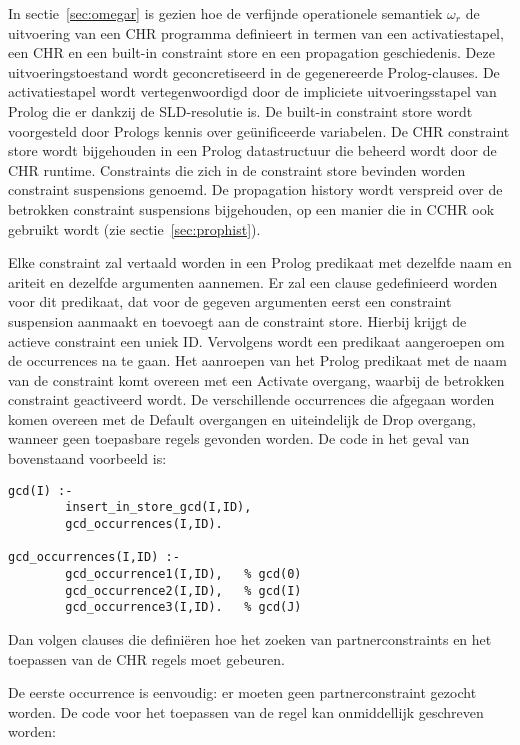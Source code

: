 In sectie~\ref{sec:omegar} is gezien hoe de verfijnde operationele semantiek $\omega_r$ de uitvoering van een CHR programma definieert in termen van een activatiestapel, een CHR en een built-in constraint store en een propagation geschiedenis. Deze uitvoeringstoestand wordt geconcretiseerd in de gegenereerde Prolog-clauses. De activatiestapel wordt vertegenwoordigd door de impliciete uitvoeringsstapel van Prolog die er dankzij de SLD-resolutie is. De built-in constraint store wordt voorgesteld door Prologs kennis over ge\"unificeerde variabelen. De CHR constraint store wordt bijgehouden in een Prolog datastructuur die beheerd wordt door de CHR runtime. Constraints die zich in de constraint store bevinden worden constraint suspensions genoemd. De propagation history wordt verspreid over de betrokken constraint suspensions bijgehouden, op een manier die in CCHR ook gebruikt wordt (zie sectie~\ref{sec:prophist}).

Elke constraint zal vertaald worden in een Prolog predikaat met dezelfde naam en ariteit en dezelfde argumenten aannemen. Er zal een clause gedefinieerd worden voor dit predikaat, dat voor de gegeven argumenten eerst een constraint suspension aanmaakt en toevoegt aan de constraint store. Hierbij krijgt de actieve constraint een uniek ID. Vervolgens wordt een predikaat aangeroepen om de occurrences na te gaan. Het aanroepen van het Prolog predikaat met de naam van de constraint komt overeen met een Activate overgang, waarbij de betrokken constraint geactiveerd wordt. De verschillende occurrences die afgegaan worden komen overeen met de Default overgangen en uiteindelijk de Drop overgang, wanneer geen toepasbare regels gevonden worden. De code in het geval van bovenstaand voorbeeld is:

{\scriptsize \begin{Verbatim}[frame=single]
gcd(I) :-
        insert_in_store_gcd(I,ID),
        gcd_occurrences(I,ID).

gcd_occurrences(I,ID) :-
        gcd_occurrence1(I,ID),   % gcd(0)
        gcd_occurrence2(I,ID),   % gcd(I)
        gcd_occurrence3(I,ID).   % gcd(J)
\end{Verbatim}
}

Dan volgen clauses die defini\"eren hoe het zoeken van partnerconstraints en het toepassen van de CHR regels moet gebeuren.

De eerste occurrence is eenvoudig: er moeten geen partnerconstraint gezocht worden. De code voor het toepassen van de regel kan onmiddellijk geschreven worden:

